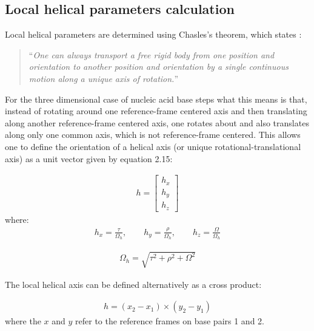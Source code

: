 \subsection{Local helical parameters calculation}

Local helical parameters are determined using Chasles's theorem, which
states \cite{babcock1994}:
\begin{quote}
``\textit{One can  always transport  a free rigid  body from one  position and
  orientation  to  another  position   and  orientation  by  a  single
  continuous motion along a unique axis of rotation.}''
\end{quote}

\noindent For  the three dimensional  case of nucleic acid  base steps
what   this  means   is   that,  instead   of   rotating  around   one
reference-frame  centered  axis  and  then translating  along  another
reference-frame centered  axis, one rotates about  and also translates
along   only   one  common   axis,   which   is  not   reference-frame
centered. This allows one to  define the orientation of a helical axis
(or unique  rotational-translational axis) as  a unit vector  given by
equation 2.15:

\begin{gather}
h=\left[ \begin{array}{c}
h_x\\
h_y\\
h_z
\end{array} \right]
\end{gather}
where:
\begin{gather}
h_x = \frac{\tau}{\Omega_h}, \qquad h_y = \frac{\rho}{\Omega_h},
\qquad h_z = \frac{\Omega}{\Omega_h}
\end{gather}

\begin{gather}
\Omega_h = \sqrt{\tau^2 + \rho^2 + \Omega^2}
\end{gather}

The local helical axis can be defined alternatively \cite{bansal1995}
as a cross product:

\begin{gather}
h = (x_2 - x_1) \times (y_2 - y_1)
\end{gather}
where the  $x$ and $y$ refer to  the reference frames on  base pairs 1
and 2.

